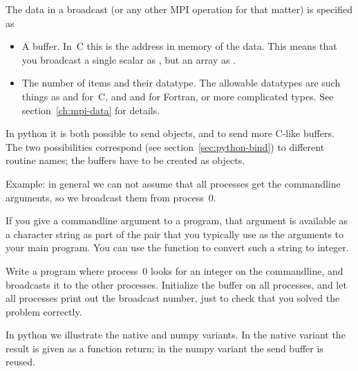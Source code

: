 The data in a broadcast (or any other MPI operation for that matter)
is specified as
\begin{itemize}
\item A buffer. In~C this is the address in memory of the data. This means
  that you broadcast a single scalar as ,
  but an array as .
\item The number of items and their datatype. The allowable datatypes
  are such things as  and  for~C, and
   and  for Fortran, or more complicated types.
  See section~\ref{ch:mpi-data} for details.
\end{itemize}
\begin{pythonnote}
  In python it is both possible to send objects, and to send more
  C-like buffers. The two possibilities correspond (see
  section~\ref{sec:python-bind}) to different routine names; the
  buffers have to be created as  objects.
\end{pythonnote}
%
Example: in general we can not assume that all processes get the
commandline arguments, so we broadcast them from process~0.



\begin{exercise}
  \label{ex:argv-bcast}
  If you give a commandline argument to a program, that argument is available
  as a character string as part of the  pair that you typically use
  as the arguments to your main program. You can use the function  to
  convert such a string to integer.

  Write a program where process~0 looks for an integer on the commandline, and
  broadcasts it to the other processes. Initialize the buffer on all processes, and
  let all processes print out the broadcast number,
  just to check that you solved the problem correctly.
\end{exercise}

In python we illustrate the native and numpy variants. In the native
variant the result is given as a function return; in the numpy variant
the send buffer is reused.
%

